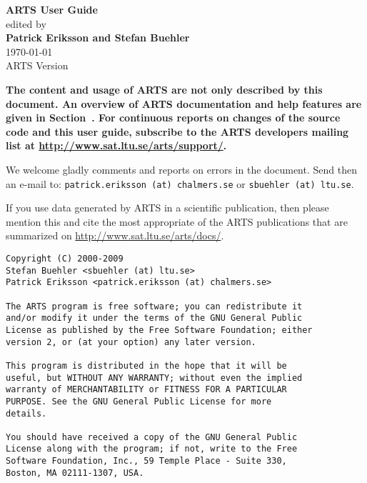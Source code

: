 \documentclass[11pt,twoside,a4paper,fleqn]{book}
\begin{document}
%
\renewcommand{\thepage}{title \arabic{page}} 

\thispagestyle{plain}
\begin{center}
  \vspace*{1cm}
  {\Huge \bf ARTS User Guide\\}
  \vspace*{1cm}
  {\large edited by \\}
  \vspace*{1cm}
  {\Large \bf Patrick Eriksson and Stefan Buehler }\\
   \vspace*{2cm}
   {\large \today\\
    ARTS Version 
   }
\end{center}
\vspace*{\fill}
{\normalsize \bf
  \noindent
  The content and usage of ARTS are not only described by this
  document. An overview of ARTS documentation and help features are
  given in Section~. For continuous reports on
  changes of the source code and this user guide, subscribe to the
  ARTS developers mailing list at \url{http://www.sat.ltu.se/arts/support/}.

  We welcome gladly comments and reports on errors in the document.
  Send then an e-mail to: \verb|patrick.eriksson (at) chalmers.se| or 
  \verb|sbuehler (at) ltu.se|.

  If you use data generated by ARTS in a scientific
  publication, then please mention this and cite the most
  appropriate of the ARTS publications that are summarized on
  \url{http://www.sat.ltu.se/arts/docs/}.
}

\newpage                          
\thispagestyle{empty}
\vspace*{\fill}
\noindent
\begin{verbatim}
Copyright (C) 2000-2009
Stefan Buehler <sbuehler (at) ltu.se>
Patrick Eriksson <patrick.eriksson (at) chalmers.se>

The ARTS program is free software; you can redistribute it
and/or modify it under the terms of the GNU General Public
License as published by the Free Software Foundation; either
version 2, or (at your option) any later version.

This program is distributed in the hope that it will be
useful, but WITHOUT ANY WARRANTY; without even the implied
warranty of MERCHANTABILITY or FITNESS FOR A PARTICULAR
PURPOSE. See the GNU General Public License for more
details. 

You should have received a copy of the GNU General Public
License along with the program; if not, write to the Free
Software Foundation, Inc., 59 Temple Place - Suite 330,
Boston, MA 02111-1307, USA. 
\end{verbatim}
\end{document}
